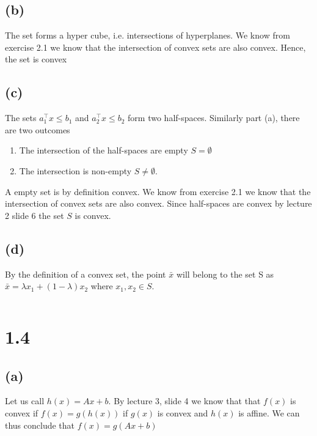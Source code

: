 \documentclass{article}
\begin{document}
	\subsection*{(b)}
		The set forms a hyper cube, i.e. intersections of hyperplanes. We know from exercise 2.1 we know that the intersection of convex sets are also convex. Hence, the set is convex
	\subsection*{(c)}
		The sets $a_1^\top x\leq b_1$ and $a_2^\top x\leq b_2$ form two half-spaces. Similarly part (a), there are two outcomes
		\begin{enumerate}
			\item The intersection of the half-spaces are empty $S=\emptyset$
			\item The intersection is non-empty $S\neq\emptyset$.
		\end{enumerate}
		A empty set is by definition convex. We know from exercise 2.1 we know that the intersection of convex sets are also convex. Since half-spaces are convex by lecture 2 slide 6 the set $S$ is convex.
	\subsection*{(d)}
		By the definition of a convex set, the point $\bar{x}$ will belong to the set S as $\bar{x} = \lambda x_1 + (1-\lambda) x_2$ where $x_1,x_2 \in S$. 
		
		\begin{equation}
			
		\end{equation}
		
\section*{1.4}
	\subsection*{(a)}
	Let us call $h(x) = Ax + b$.
	By lecture 3, slide 4 we know that that $f(x)$ is convex if $f(x) = g(h(x))$ if $g(x)$ is convex and $h(x)$ is affine. We can thus conclude that $f(x) = g(Ax+b)$
\end{document}
